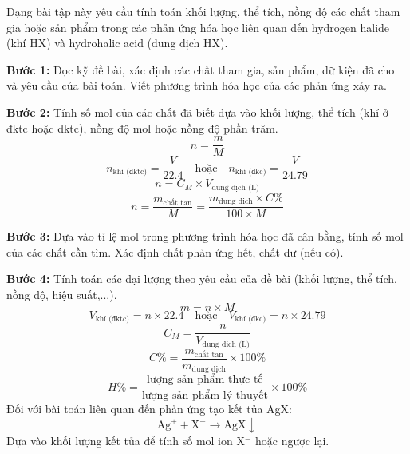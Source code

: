 \documentclass[Main.tex]{subfiles}
\begin{document}
	    \begin{phuongphap}
	    Dạng bài tập này yêu cầu tính toán khối lượng, thể tích, nồng độ các chất tham gia hoặc sản phẩm trong các phản ứng hóa học liên quan đến hydrogen halide (khí HX) và hydrohalic acid (dung dịch HX).
	    \begin{cacbuoc}
	        \item \textbf{Bước 1:} Đọc kỹ đề bài, xác định các chất tham gia, sản phẩm, dữ kiện đã cho và yêu cầu của bài toán. Viết phương trình hóa học của các phản ứng xảy ra.
	        \item \textbf{Bước 2:} Tính số mol của các chất đã biết dựa vào khối lượng, thể tích (khí ở đktc hoặc dktc), nồng độ mol hoặc nồng độ phần trăm.
	        \[ n = \frac{m}{M} \]
	        \[ n_{\text{khí (đktc)}} = \frac{V}{22.4} \quad \text{hoặc} \quad n_{\text{khí (đkc)}} = \frac{V}{24.79} \]
	        \[ n = C_M \times V_{\text{dung dịch (L)}} \]
	        \[ n = \frac{m_{\text{chất tan}}}{M} = \frac{m_{\text{dung dịch}} \times C\%}{100 \times M} \]
	        \item \textbf{Bước 3:} Dựa vào tỉ lệ mol trong phương trình hóa học đã cân bằng, tính số mol của các chất cần tìm. Xác định chất phản ứng hết, chất dư (nếu có).
	        \item \textbf{Bước 4:} Tính toán các đại lượng theo yêu cầu của đề bài (khối lượng, thể tích, nồng độ, hiệu suất,...).
	        \[ m = n \times M \]
	        \[ V_{\text{khí (đktc)}} = n \times 22.4 \quad \text{hoặc} \quad V_{\text{khí (đkc)}} = n \times 24.79 \]
	        \[ C_M = \frac{n}{V_{\text{dung dịch (L)}}} \]
	        \[ C\% = \frac{m_{\text{chất tan}}}{m_{\text{dung dịch}}} \times 100\% \]
	        \[ H\% = \frac{\text{lượng sản phẩm thực tế}}{\text{lượng sản phẩm lý thuyết}} \times 100\% \]
	        Đối với bài toán liên quan đến phản ứng tạo kết tủa AgX:
	        \[ \text{Ag}^+ + \text{X}^- \rightarrow \text{AgX} \downarrow \]
	        Dựa vào khối lượng kết tủa để tính số mol ion X$^-$ hoặc ngược lại.
	    \end{cacbuoc}
	    \end{phuongphap}
	    
\end{document}
